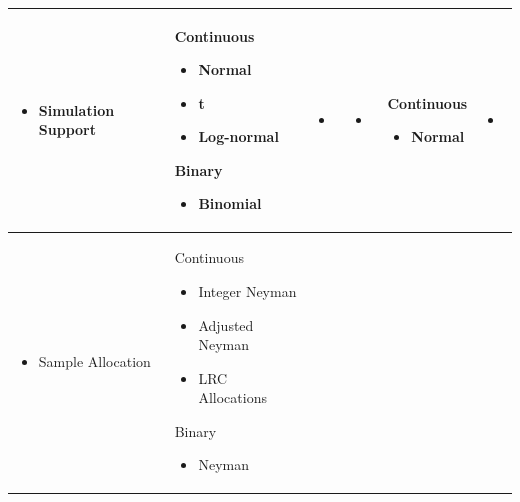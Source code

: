 \begin{table}[!ht]
{\begin{tabular}{p{2.5cm} p{3.3cm} p{3cm} p{3cm} p{3.1cm} p{3cm}}
\begin{itemize}[label={},nosep,leftmargin=*,topsep=0pt]
  \item Simulation \newline Support
\end{itemize} & Continuous \begin{itemize}[nosep,after=\strut,leftmargin=*,topsep=0pt,itemsep=0pt,parsep=0pt,partopsep=0pt]
    \item Normal
    \item t
    \item Log-normal
\end{itemize} Binary \begin{itemize}[nosep,after=\strut,leftmargin=*,topsep=0pt,itemsep=0pt,parsep=0pt,partopsep=0pt]
    \item Binomial
\end{itemize} & \begin{itemize}[nosep,after=\strut,leftmargin=*]
    \item[--]
\end{itemize} & \begin{itemize}[nosep,after=\strut,leftmargin=*]
    \item[--]
\end{itemize} & Continuous \begin{itemize}[nosep,after=\strut,leftmargin=*]
    \item Normal
\end{itemize} & \begin{itemize}[nosep,after=\strut,leftmargin=*]
    \item[--]
\end{itemize} \\ \midrule
\begin{itemize}[label={},nosep,leftmargin=*,topsep=0pt]
  \item {Sample \newline Allocation}
\end{itemize}
 & Continuous \begin{itemize}[nosep,after=\strut,leftmargin=*,topsep=0pt,itemsep=0pt,parsep=0pt,partopsep=0pt] 
    \item Integer Neyman
    \item Adjusted Neyman
    \item LRC Allocations
\end{itemize} 
Binary \begin{itemize}[nosep,after=\strut,leftmargin=*,topsep=0pt,itemsep=0pt,parsep=0pt,partopsep=0pt]
    \item Neyman

\end{itemize}
\end{tabular}}
\end{table}

